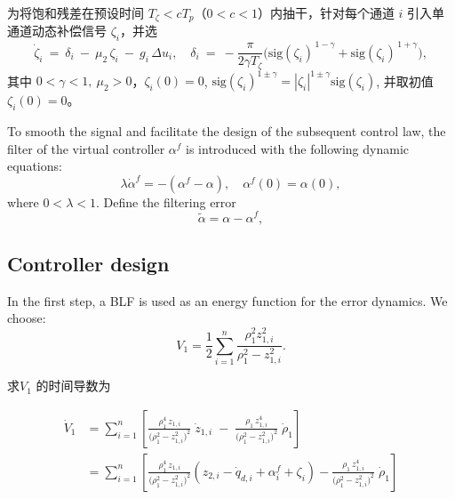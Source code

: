 \documentclass[pdflatex,sn-mathphys-num]{sn-jnl}%
\theoremstyle{thmstyleone}%
\theoremstyle{thmstyletwo}%
\theoremstyle{thmstylethree}%
\begin{document}
为将饱和残差在预设时间 $T_\zeta<cT_p$（$0<c<1$）内抽干，针对每个通道 $i$ 引入单通道动态补偿信号 $\zeta_{i}$，并选
\begin{equation}\label{eq:zeta2-pts}
\dot\zeta_i \ =\ \delta_i\ -\ \mu_2\,\zeta_i\ -\ g_i\,\Delta u_i,\quad
\delta_i\ =\ -\frac{\pi}{2\gamma T_\zeta}\Big(\mathrm{sig}(\zeta_i)^{\,1-\gamma}+\mathrm{sig}(\zeta_i)^{\,1+\gamma}\Big),
\end{equation}
其中 $0<\gamma<1,\ \mu_2>0$，$\zeta_i(0)=0$, $\mathrm{sig}(\zeta_i)^{1\pm \gamma}=|\zeta_i|^{1\pm \gamma}\mathrm{sig}(\zeta_i)$, 并取初值 $\zeta_{i}(0)=0$。



 To smooth the signal and facilitate the design of the subsequent control law, the filter of the virtual controller $\alpha^{f}$ is introduced with the following dynamic equations:
\begin{equation}\label{eq:22}
	\lambda \dot{\alpha}^{f}
	= -\left(\alpha^{f}-\alpha\right),
	\quad
	\alpha^{f}(0)=\alpha(0),
\end{equation}
where $0<\lambda<1$. Define the filtering error 
\begin{equation}\label{eq:23}
	\tilde{\alpha}= \alpha-\alpha^{f},
\end{equation}


\subsection{Controller design}



In the first step, a BLF is used as an energy function for the error dynamics. We choose:
\begin{equation}\label{eq:25}
	V_1= \frac{1}{2}\sum_{i=1}^{n} \frac{\rho_{1}^2 z_{1,i}^2}{\rho_{1}^2-z_{1,i}^2}. 
\end{equation}

求$V_1$ 的时间导数为

\begin{equation}\label{eq:25}
	\begin{aligned}
\dot V_1
&=\sum_{i=1}^{n}\left[
\frac{\rho_{1}^4\,z_{1,i}}{\big(\rho_{1}^{2}-z_{1,i}^{2}\big)^{2}}\;\dot z_{1,i}
\;-\;
\frac{\rho_{1}\,z_{1,i}^{4}}{\big(\rho_{1}^{2}-z_{1,i}^{2}\big)^{2}}\;\dot \rho_{1}
\right]\\
&=\sum_{i=1}^{n}\left[
\frac{\rho_{1}^4\,z_{1,i}}{\big(\rho_{1}^{2}-z_{1,i}^{2}\big)^{2}}(z_{2,i}-\dot q_{d,i}+\alpha^{f}_i+\zeta_i)-
\frac{\rho_{1}\,z_{1,i}^{4}}{\big(\rho_{1}^{2}-z_{1,i}^{2}\big)^{2}}\;\dot \rho_{1}
\right]
\end{aligned}
\end{equation}
\end{document}
